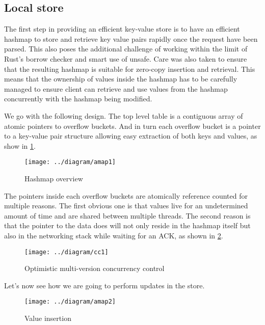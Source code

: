 \documentclass[11pt]{article}
\begin{document}
\subsection{Local store} \label{design-overview}
The first step in providing an efficient key-value store is to
have an efficient hashmap to store and retrieve key value pairs
rapidly once the request have been parsed. This also poses the
additional challenge of working within the limit of Rust's borrow
checker and smart use of unsafe. Care was also taken to ensure that
the resulting hashmap is suitable for zero-copy insertion and
retrieval. This means that the ownership of values inside the hashmap
has to be carefully managed to ensure client can retrieve and use
values from the hashmap concurrently with the hashmap being modified.

We go with the following design. The top level table is a contiguous
array of atomic pointers to overflow buckets. And in turn each
overflow bucket is a pointer to a key-value pair structure allowing
easy extraction of both keys and values, as show in \ref{fig:hashmap}.

\begin{figure}[h!]
  \texttt{[image: ../diagram/amap1]}
  \caption{Hashmap overview}
  \label{fig:hashmap}
\end{figure}

The pointers inside each overflow buckets are atomically reference
counted for multiple reasons. The first obvious one is that values
live for an undetermined amount of time and are shared between
multiple threads. The second reason is that the pointer to the data
does will not only reside in the hashmap itself but also in the
networking stack while waiting for an ACK, as shown in
\ref{fig:omvcc}.

\begin{figure}[h!]
  \texttt{[image: ../diagram/cc1]}
  \caption{Optimistic multi-version concurrency control}
  \label{fig:omvcc}
\end{figure}

Let's now see how we are going to perform updates in the store.

\begin{figure}[h!]
  \texttt{[image: ../diagram/amap2]}
  \caption{Value insertion}
  \label{fig:omvcc-insert}
\end{figure}
\end{document}

